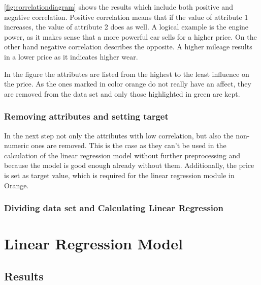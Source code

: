 \autoref{fig:correlationdiagram} shows the results which include both positive and negative correlation. Positive correlation means that if the value of attribute 1
increases, the value of attribute 2 does as well. A logical example is the engine power, as it makes sense that a more powerful car sells for a higher price. On the other hand
negative correlation describes the opposite. A higher mileage results in a lower price as it indicates higher wear.
\par
In the figure the attributes are listed from the highest to the least influence on the price. As the ones marked in color orange do not really have an affect, they are removed from
the data set and only those highlighted in green are kept.

\subsubsection{Removing attributes and setting target}
In the next step not only the attributes with low correlation, but also the non-numeric ones are removed. This is the case as they can't be used in the calculation
of the linear regression model without further preprocessing and because the model is good enough already without them. Additionally, the price is set as 
target value, which is required for the linear regression module in Orange.

\subsubsection{Dividing data set and Calculating Linear Regression}


\section{Linear Regression Model}
\subsection{Results}

